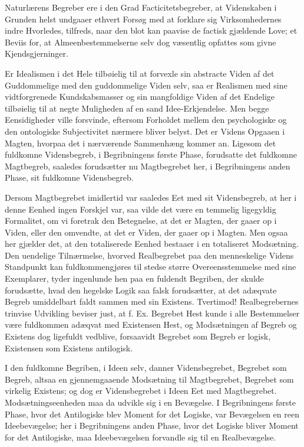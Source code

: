 \documentclass[11pt]{book}
\newcommand{\opage}[1]{\marginnote{\footnotesize\textit{[#1]}}}
\begin{document}
Naturlærens Begreber ere i den Grad Facticitetsbegreber, at
Videnskaben i Grunden helst undgaaer ethvert Forsøg med
\opage{199} \setcounter{footnote}{0}%
at forklare sig Virksomhedernes indre Hvorledes, tilfreds, naar den
blot kan paavise de factisk gjældende Love; et Beviis for, at
Almeenbestemmelserne selv dog væsentlig opfattes som givne
Kjendsgjerninger.

Er Idealismen i det Hele tilbøielig til at forvexle sin abstracte Viden
af det Guddommelige med den guddommelige Viden selv, saa er Realismen
med sine vidtforgrenede Kundskabsmasser og sin mangfoldige Viden af det
Endelige tilbøielig til at negte Muligheden af en sand Idee-Erkjendelse.
Men begge Eensidigheder ville forsvinde, eftersom Forholdet mellem den
psychologiske og den ontologiske Subjectivitet nærmere bliver belyst.
Det er Videns Opgaaen i Magten, hvorpaa det i nærværende Sammenhæng
kommer an. Ligesom det fuldkomne Vidensbegreb, i Begribningens første
Phase, forudsatte det fuldkomne Magtbegreb, saaledes forudsætter nu
Magtbegrebet her, i Begribningens anden Phase, sit fuldkomne
Vidensbegreb.

Dersom Magtbegrebet imidlertid var saaledes Eet med sit Vidensbegreb,
at her i denne Eenhed ingen Forskjel var, saa vilde det være en
temmelig ligegyldig Formalitet, om vi foretrak den Betegnelse, at det
er Magten, der gaaer op i Viden, eller den omvendte, at det er Viden,
der gaaer op i Magten. Men ogsaa her gjælder det, at den totaliserede
Eenhed bestaaer i en totaliseret Modsætning. Den uendelige Tilnærmelse,
hvorved Realbegrebet paa den menneskelige Videns Standpunkt kan
fuldkommengjøres til stedse større Overeensstemmelse med sine
Exemplarer, tyder ingenlunde hen paa en fuldendt Begriben, der skulde
forudsætte, hvad den hegelske Logik saa falsk forudsætter, at det
adæqvate Begreb umiddelbart faldt sammen med sin Existens. Tvertimod!
Realbegrebernes trinvise Udvikling beviser just, at f. Ex. Begrebet
Hest kunde i alle Bestemmelser være fuldkommen adæqvat med Existensen
Hest, og Modsætningen af Begreb og Existens
\opage{200} \setcounter{footnote}{0}%
dog ligefuldt vedblive, forsaavidt Begrebet som Begreb er logisk,
Existensen som Existens antilogisk.

I den fuldkomne Begriben, i Ideen selv, danner Vidensbegrebet, Begrebet
som Begreb, altsaa en gjennemgaaende Modsætning til Magtbegrebet,
Begrebet som virkelig Existens; og dog er Vidensbegrebet i Ideen Eet
med Magtbegrebet. Modsætningseenheden maa da udvikle sig i en
Bevægelse. I Begribningens første Phase, hvor det Antilogiske blev
Moment for det Logiske, var Bevægelsen en reen Ideebevægelse; her i
Begribningens anden Phase, hvor det Logiske bliver Moment for det
Antilogiske, maa Ideebevægelsen forvandle sig til en Realbevægelse.
\end{document}
